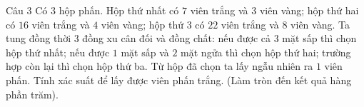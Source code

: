 \begin{bt}%
Câu 3
 Có $3$ hộp phấn. Hộp thứ nhất có $7$ viên trắng và $3$ viên vàng; hộp thứ hai có $16$ viên trắng và $4$ viên vàng; hộp thứ $3$ có $22$ viên trắng và $8$ viên vàng. Ta tung đồng thời $3$ đồng xu cân đối và đồng chất: nếu được cả $3$ mặt sấp thì chọn hộp thứ nhất; nếu được $1$ mặt sấp và $2$ mặt ngửa thì chọn hộp thứ hai; trường hợp còn lại thì chọn hộp thứ ba. Từ hộp đã chọn ta lấy ngẫu nhiên ra $1$ viên phấn. Tính xác suất để lấy được viên phấn trắng. (Làm tròn đến kết quả hàng phần trăm).
\end{bt}

